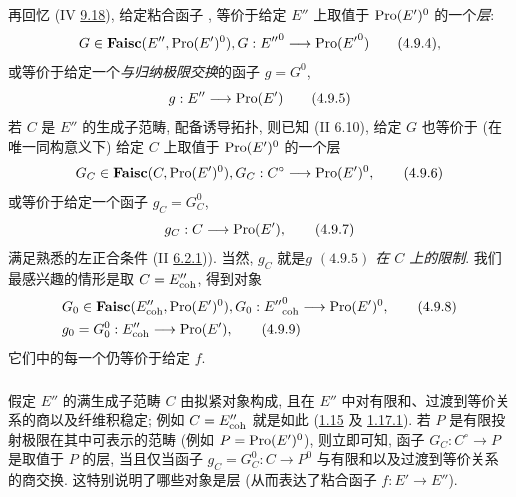 再回忆 (IV \hyperref[IV.subsec9.6]{9.18}),
给定粘合函子 ,
等价于给定 $E''$ 上取值于 $\operatorname{Pro}(E')^0$ 的一个\emph{层}:
\begin{equation*}
G \in \Ffaisc (E'', \Pro(E')^{0}), G : {E''}^{0} \to \Pro({E'}^{0})
\tag{4.9.4}{\quoi},
\end{equation*}
或等价于给定一个\emph{与归纳极限交换}的函子 $g=G^0$,
\begin{equation*}
g:E''\to \Pro (E')\tag{4.9.5}
\end{equation*}
若 $C$ 是 $E''$ 的生成子范畴, 配备诱导拓扑,
则已知 (II 6.10),
给定 $G$ 也等价于
(在唯一同构意义下) 给定 $C$ 上取值于 $\operatorname{Pro}(E')^0$ 的一个层
\begin{equation*}
G_C \in \Ffaisc (C, \Pro(E')^0), G_C : C^{\circ} \to \Pro (E')^{0}{\quoi},\tag{4.9.6}
\end{equation*}
或等价于给定一个函子 $g_C=G_C^0$,
\begin{equation*}
g_C : C \to \Pro (E'){\quoi},\tag{4.9.7}
\end{equation*}
满足\pageoriginale{}熟悉的左正合条件
(II \hyperlink{sga4.exp.II.remark.6.2.item.1}{6.2.1})).
当然, $g_C$ 就是\emph{$g$ $\hyperref[VI.eq4.9.5]{(4.9.5)}$ 在 $C$ 上的限制}.
我们最感兴趣的情形是取 $C=E''_{\mathrm{coh}}$,
得到对象
\hypertarget{sga4.exp.VI.equation.4.9.8}{}\begin{align*}
& G_0 \in \Ffaisc (E''_{\coh}, \Pro (E')^{0}), G_0 : {E''}_{\coh}^0 \to
 \Pro (E')^0 {\quoi},\tag{4.9.8}\\
& g_0 = G^0_0 : E''_{\coh} \to \Pro(E'){\quoi},\tag{4.9.9}
\end{align*}\hypertarget{sga4.exp.VI.equation.4.9.9}{}
它们中的每一个仍等价于给定 $f$.

\setcounter{subsubsection}{9}
\subsubsection{}

假定 $E''$ 的满生成子范畴 $C$ 由拟紧对象构成,
且在 $E''$ 中对有限和、过渡到等价关系的商以及纤维积稳定;
例如 $C=E''_{\mathrm{coh}}$ 就是如此
(\hyperref[VI.cor1.15]{1.15} 及 \hyperref[VI.cor1.17.1]{1.17.1}).
若 $P$ 是有限投射极限在其中可表示的范畴
(例如 $P=\operatorname{Pro}(E')^0$),
则立即可知,
函子 $G_C:C^{\circ}\to P$ 是取值于 $P$ 的层,
当且仅当函子 $g_C=G_C^0:C\to P^0$
与有限和以及过渡到等价关系的商交换.
这特别说明了哪些对象是层 
(从而表达了粘合函子 $f:E'\to E''$).

